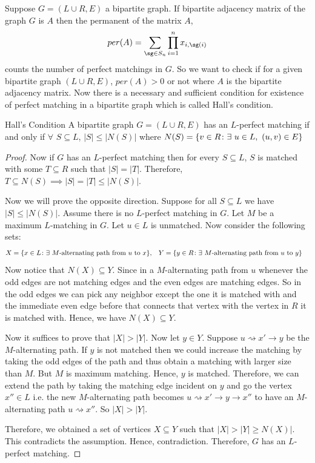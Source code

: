 Suppose $G=(L\cup R,E)$ a bipartite graph. If  bipartite adjacency matrix of the graph $G$ is $A$ then the permanent of the matrix $A$, $$per(A)=\sum\limits_{\sg\in S_n}\prod_{i=1}^n x_{i,\sg(i)}$$ counts the number of perfect matchings in $G$. So we want to check if for a given bipartite graph $(L\cup R,E)$, $per(A)>0$ or not where $A$ is the bipartite adjacency matrix. Now there is a necessary and sufficient condition for existence of perfect matching in a bipartite graph which is called Hall's condition.
\begin{Theorem}{Hall's Condition}{}
	A bipartite graph $G=(L\cup R,E)$ has an $L$-perfect matching if and only if $\forall $ $S\subseteq L$, $|S|\leq |N(S)|$ where $N(S)=\{v\in R\colon \exs\ u\in L,\ (u,v)\in E\}$
\end{Theorem}
\begin{proof}
	Now if $G$ has an $L$-perfect matching then for every $S\subseteq L$, $S$ is matched with some $T\subseteq R$ such that $|S|=|T|$. Therefore, $T\subseteq N(S)\implies |S|=|T|\leq |N(S)|$.

	Now we will prove the opposite direction. Suppose for all $S\subseteq L$ we have $|S|\leq |N(S)|$. Assume there is no $L$-perfect matching in $G$. Let $M$ be a maximum $L$-matching in $G$. Let $u\in L$ is unmatched. Now consider the following sets:\begin{align*}
		X & =\{x\in L\colon \exists\text{ $M$-alternating path from $u$ to $x$}\}, & Y & =\{y\in R\colon \exists\text{ $M$-alternating path from $u$ to $y$}\}
	\end{align*}
	Now notice that $N(X)\subseteq Y$. Since in a $M$-alternating path from $u$ whenever the odd edges are not matching edges and the even edges are matching edges. So in the odd edges we can pick any neighbor except the one it is matched with and the immediate even edge before that connects that vertex with the vertex in $R$ it is matched with. Hence, we have $N(X)\subseteq Y$.

	Now it suffices to prove that $|X|>|Y|$. Now let $y\in Y$. Suppose $u\rightsquigarrow x'\to y$ be the $M$-alternating path. If $y$ is not matched then we could increase the matching by taking the odd edges of the path and thus obtain a matching with larger size than $M$. But $M$ is maximum matching. Hence, $y$ is matched. Therefore, we can extend the path by taking the matching edge incident on $y$ and go the vertex $x''\in L$ i.e. the new $M$-alternating path becomes $u\rightsquigarrow x'\to y\to x''$ to have an $M$-alternating path $u\rightsquigarrow x''$. So $|X|>|Y|$.

	Therefore, we obtained a set of vertices $X\subseteq Y$ such that $|X|>|Y|\geq N(X)|$. This contradicts the assumption. Hence, contradiction. Therefore, $G$ has an $L$-perfect matching.
\end{proof}


